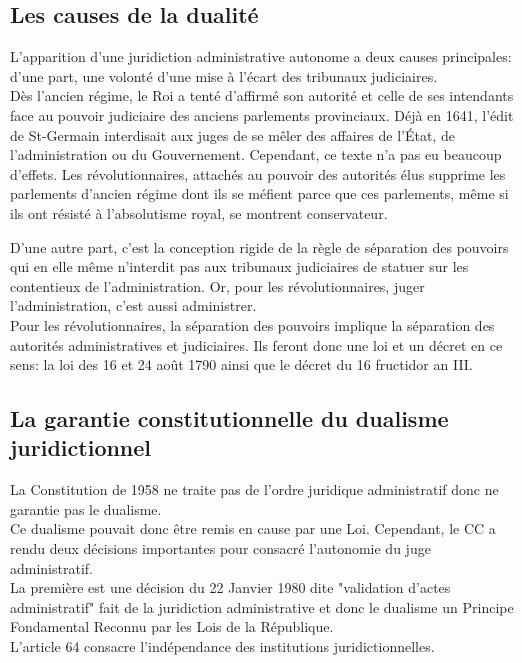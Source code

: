 \documentclass[12pt, a4paper, openany]{book}
\begin{document}
\subsection{Les causes de la dualité}

L'apparition d'une juridiction administrative autonome a deux causes principales: d'une part, une volonté d'une mise à l'écart des tribunaux judiciaires. \\
Dès l'ancien régime, le Roi a tenté d'affirmé son autorité et celle de ses intendants face au pouvoir judiciaire des anciens parlements provinciaux. Déjà en 1641, l'édit de St-Germain interdisait aux juges de se mêler des affaires de l'État, de l'administration ou du Gouvernement. Cependant, ce texte n'a pas eu beaucoup d'effets. Les révolutionnaires, attachés au pouvoir des autorités élus supprime les parlements d'ancien régime dont ils se méfient parce que ces parlements, même si ils ont résisté à l'absolutisme royal, se montrent conservateur.


D'une autre part, c'est la conception rigide de la règle de séparation des pouvoirs qui en elle même n'interdit pas aux tribunaux judiciaires de statuer sur les contentieux de l'administration. Or, pour les révolutionnaires, juger l'administration, c'est aussi administrer. \\
Pour les révolutionnaires, la séparation des pouvoirs implique la séparation des autorités administratives et judiciaires. Ils feront donc une loi et un décret en ce sens: la loi des 16 et 24 août 1790 ainsi que le décret du 16 fructidor an III. 


\subsection{La garantie constitutionnelle du dualisme juridictionnel}

La Constitution de 1958 ne traite pas de l'ordre juridique administratif donc ne garantie pas le dualisme. \\
Ce dualisme pouvait donc être remis en cause par une Loi. Cependant, le CC a rendu deux décisions importantes pour consacré l'autonomie du juge administratif. \\
La première est une décision du 22 Janvier 1980 dite "validation d'actes administratif" fait de la juridiction administrative et donc le dualisme un Principe Fondamental Reconnu par les Lois de la République. \\
L'article 64 consacre l'indépendance des institutions juridictionnelles.
\end{document}
